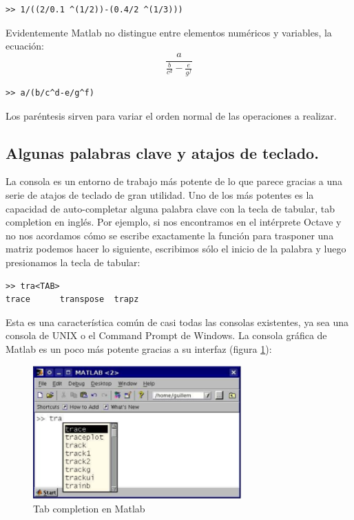 \begin{lstlisting}
>> 1/((2/0.1 ^(1/2))-(0.4/2 ^(1/3)))
\end{lstlisting}

Evidentemente Matlab no distingue entre elementos numéricos y
variables, la ecuación:
$$\frac{a}{\frac{b}{c{}^{d}}-\frac{e}{g^{f}}}$$
\begin{lstlisting}
>> a/(b/c^d-e/g^f)
\end{lstlisting}

Los paréntesis sirven para variar el orden normal de las operaciones a
realizar.


\subsection{Algunas palabras clave y atajos de teclado.}

La consola es un entorno de trabajo más potente de lo que parece
gracias a una serie de atajos de teclado de gran utilidad. Uno de los
más potentes es la capacidad de auto-completar alguna palabra clave
con la tecla de tabular, tab completion en inglés. Por ejemplo, si nos
encontramos en el intérprete Octave y no nos acordamos cómo se escribe
exactamente la función para trasponer una matriz podemos hacer lo
siguiente, escribimos sólo el inicio de la palabra y luego presionamos
la tecla de tabular:

\begin{lstlisting}
>> tra<TAB>
trace      transpose  trapz
\end{lstlisting}

Esta es una característica común de casi todas las consolas
existentes, ya sea una consola de UNIX o el Command Prompt de Windows.
La consola gráfica de Matlab es un poco más potente gracias a su
interfaz (figura \ref{cap:Tab-completion-en}):

%
\begin{figure}[h]
  \centering{}\includegraphics[width=8cm,
  keepaspectratio]{figuras/autocompletion}


  \caption{\label{cap:Tab-completion-en}Tab completion en Matlab}
\end{figure}


